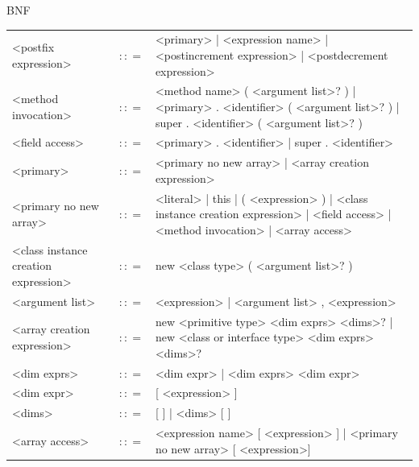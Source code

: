 \documentclass[landscape, 11pt]{article}
\begin{document}
\begin{qsection}{BNF}
\begin{enumerate}[label=\bt{\theenumi.}]
\begin{longtable}{R{7cm} c L{15cm}}
				<postfix expression>						&	$\colon\colon=$	&	<primary> | <expression name> | <postincrement expression> | <postdecrement expression>
				\\
				<method invocation>							&	$\colon\colon=$	&	<method name> ( <argument list>? ) | <primary> . <identifier> ( <argument list>? ) | super . <identifier> ( <argument list>? )
				\\
				<field access>								&	$\colon\colon=$	&	<primary> . <identifier> | super . <identifier>
				\\
				<primary>									&	$\colon\colon=$	&	<primary no new array> | <array creation expression>
				\\
				<primary no new array>						&	$\colon\colon=$	&	<literal> | this | ( <expression> ) | <class instance creation expression> | <field access> | <method invocation> | <array access>
				\\
				<class instance creation expression>		&	$\colon\colon=$	&	new <class type> ( <argument list>? )
				\\
				<argument list>								&	$\colon\colon=$	&	<expression> | <argument list> , <expression>
				\\
				<array creation expression>					&	$\colon\colon=$	&	new <primitive type> <dim exprs> <dims>? | new <class or interface type> <dim exprs> <dims>?
				\\
				<dim exprs>									&	$\colon\colon=$	&	<dim expr> | <dim exprs> <dim expr>
				\\
				<dim expr>									&	$\colon\colon=$	&	[ <expression> ]
				\\
				<dims>										&	$\colon\colon=$	&	[ ] | <dims> [ ]
				\\
				<array access>								&	$\colon\colon=$	&	<expression name> [ <expression> ] | <primary no new array> [ <expression>]
			\end{longtable}

		\ditem[Expressions.]


\end{enumerate}
\end{qsection}
\end{document}
